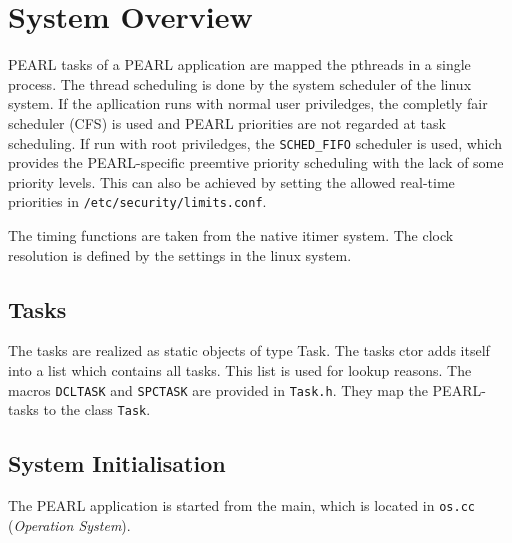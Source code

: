 \section{System Overview}

PEARL tasks of a PEARL application are mapped the pthreads in a single
process.  The thread scheduling is done by the system scheduler of the 
linux system. If the apllication runs with normal user priviledges, the
completly fair scheduler (CFS) is used and PEARL priorities are not
regarded at task scheduling. If run with root priviledges, the 
\texttt{SCHED\_FIFO} scheduler is used, which provides the 
PEARL-specific preemtive priority scheduling with the lack of some 
priority levels. This can also be achieved by setting the allowed
real-time priorities in \verb|/etc/security/limits.conf|.

The timing functions are taken from the native itimer system.
The clock resolution is defined by the settings in the linux system.

\subsection{Tasks}
The tasks are realized as static objects of type Task.
The tasks ctor adds itself into a list which contains all tasks.
This list is used for lookup reasons. 
The macros \texttt{DCLTASK} and \texttt{SPCTASK} are provided in 
\texttt{Task.h}. They map the PEARL-tasks to the class \texttt{Task}.

\subsection{System Initialisation}
The PEARL application is started from the main, which is located in 
\verb|os.cc| ({\em Operation System}).

